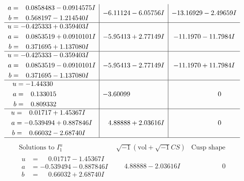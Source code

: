 \documentclass[1p]{elsarticle_modified}
\theoremstyle{definition}
\newcommand{\I}{\sqrt{-1}}
\begin{document}
$$\begin{array}{c|c|c}
\begin{aligned}
a &= \phantom{-}0.0858483 - 0.0914575 I \\
b &= \phantom{-}0.568197 - 1.214540 I\end{aligned}
 & -6.11124 - 6.05756 I & -13.16929 - 2.49659 I \\ \hline\begin{aligned}
u &= -0.425333 + 0.359403 I \\
a &= \phantom{-}0.0853519 + 0.0910101 I \\
b &= \phantom{-}0.371695 + 1.137080 I\end{aligned}
 & -5.95413 + 2.77149 I & -11.1970 - 11.7984 I \\ \hline\begin{aligned}
u &= -0.425333 - 0.359403 I \\
a &= \phantom{-}0.0853519 - 0.0910101 I \\
b &= \phantom{-}0.371695 - 1.137080 I\end{aligned}
 & -5.95413 - 2.77149 I & -11.1970 + 11.7984 I \\ \hline\begin{aligned}
u &= -1.44330\phantom{ +0.000000I} \\
a &= \phantom{-}0.133015\phantom{ +0.000000I} \\
b &= \phantom{-}0.809332\phantom{ +0.000000I}\end{aligned}
 & -3.60099\phantom{ +0.000000I} & \phantom{-0.000000 } 0 \\ \hline\begin{aligned}
u &= \phantom{-}0.01717 + 1.45367 I \\
a &= -0.539494 + 0.887846 I \\
b &= \phantom{-}0.66032 - 2.68740 I\end{aligned}
 & \phantom{-}4.88888 + 2.03616 I & \phantom{-0.000000 } 0\\
 \hline 
 \end{array}$$\newpage$$\begin{array}{c|c|c}  
\text{Solutions to }I^u_{1}& \I (\text{vol} + \sqrt{-1}CS) & \text{Cusp shape}\\
 \hline 
\begin{aligned}
u &= \phantom{-}0.01717 - 1.45367 I \\
a &= -0.539494 - 0.887846 I \\
b &= \phantom{-}0.66032 + 2.68740 I\end{aligned}
 & \phantom{-}4.88888 - 2.03616 I & \phantom{-0.000000 } 0 \\ \hline\begin{aligned}

\end{aligned}
\end{array}$$
\end{document}
